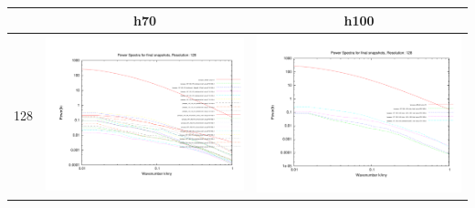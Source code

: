 \begin{itemize}
\begin{table}
\begin{tabular}{l|c|c}
 \end{tabular}
\end{table}

\begin{table}
\begin{tabular}{l|c|c}
 & h70 & h100 \\
\hline 
 128 & \includegraphics[scale=0.2]{analysis/powerspectra/fin_powspec_combined_128_h70.pdf} & \includegraphics[scale=0.2]{analysis/powerspectra/fin_powspec_combined_128_h100.pdf} \\

\end{tabular}
\end{table}
\end{itemize}
